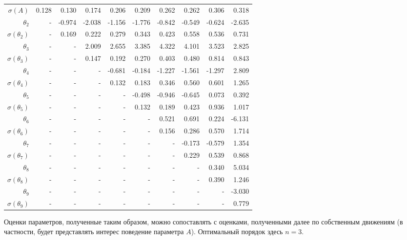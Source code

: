 \documentclass{matmex-diploma-custom}
\begin{document}
\begin{table}[h!!]
\begin{tabular}{r|rr|r|rrrrrr}
 $\sigma(A) $ & 0.128     &    0.130 &   0.174 &   0.206 &   0.209 &   0.262 &   0.262 &   0.306 &   0.318  \\
 $\theta_2$&-        &  -0.974 &  -2.038 &  -1.156 &  -1.776 &  -0.842 &  -0.549 &  -0.624 &  -2.635  \\
 $\sigma(\theta_2)$&-      &   0.169 &   0.222 &   0.279 &   0.343 &   0.423 &   0.558 &   0.536 &   0.731  \\
 $\theta_3$&-      &    - &   2.009 &   2.655 &   3.385 &   4.322 &   4.101 &   3.523 &   2.825  \\
 $\sigma(\theta_3)$&-      &    - &   0.147 &   0.192 &   0.270 &   0.403 &   0.480 &   0.814 &   0.843  \\
 $\theta_4$&-      &    - &    - &  -0.681 &  -0.184 &  -1.227 &  -1.561 &  -1.297 &   2.809  \\
 $\sigma(\theta_4)$&-      &    - &    - &   0.132 &   0.183 &   0.346 &   0.560 &   0.601 &   1.265  \\
 $\theta_5$&-      &    - &    - &    - &  -0.498 &  -0.946 &  -0.645 &   0.073 &   0.392  \\
 $\sigma(\theta_5)$&-      &    - &    - &    - &   0.132 &   0.189 &   0.423 &   0.936 &   1.017  \\
 $\theta_6$&-      &    - &    - &    - &    - &   0.521 &   0.691 &   0.224 &  -6.131  \\
 $\sigma(\theta_6)$&-    &    - &    - &    - &    - &   0.156 &   0.286 &   0.570 &   1.714  \\
 $\theta_7$&-     &    - &    - &    - &    - &    - &  -0.173 &  -0.579 &   1.354  \\
 $ \sigma(\theta_7)$&-     &    - &    - &    - &    - &    - &   0.229 &   0.539 &   0.868  \\
 $\theta_8$&-     &    - &    - &    - &    - &    - &    - &   0.340 &   5.034  \\
 $ \sigma(\theta_8)$&-     &    - &    - &    - &    - &    - &    - &   0.390 &   1.246  \\
 $\theta_9$&-     &    - &    - &    - &    - &    - &    - &    - &  -3.030  \\
 $ \sigma(\theta_9)$&-     &    - &    - &    - &    - &    - &    - &    - &   0.779  \\

\end{tabular}
\end{table}

Оценки параметров, полученные таким образом, можно сопоставлять с оценками, полученными далее по собственным движениям (в частности, будет представлять интерес поведение параметра $A$). Оптимальный порядок здесь $n = 3$.
\pagebreak
\end{document}

